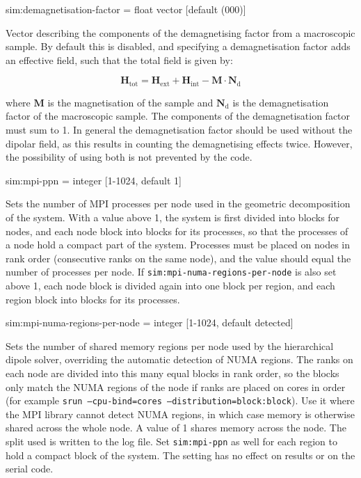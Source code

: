 {\zicf sim:demagnetisation-factor = float vector [default (000)]} Vector describing the components of the demagnetising factor from a macroscopic sample. By default this is disabled, and specifying a demagnetisation factor adds an effective field, such that the total field is given by:

\begin{equation*}
\mathbf{H}_{\mathrm{tot}} = \mathbf{H}_{\mathrm{ext}} + \mathbf{H}_{\mathrm{int}} - \mathbf{M} \cdot \mathbf{N}_{\mathrm{d}}
\end{equation*}

\noindent where $\mathbf{M}$ is the magnetisation of the sample and $\mathbf{N}_{\mathrm{d}}
$ is the demagnetisation factor of the macroscopic sample. The components of the demagnetisation factor must sum to 1. In general the demagnetisation factor should be used without the dipolar field, as this results in counting the demagnetising effects twice. However, the possibility of using both is not prevented by the code.


{\zicf sim:mpi-ppn = integer [1-1024, default 1]} Sets the number of MPI processes per node used in the geometric decomposition of the system. With a value above 1, the system is first divided into blocks for nodes, and each node block into blocks for its processes, so that the processes of a node hold a compact part of the system. Processes must be placed on nodes in rank order (consecutive ranks on the same node), and the value should equal the number of processes per node. If \texttt{sim:mpi-numa-regions-per-node} is also set above 1, each node block is divided again into one block per region, and each region block into blocks for its processes.

{\zicf sim:mpi-numa-regions-per-node = integer [1-1024, default detected]} Sets the number of shared memory regions per node used by the hierarchical dipole solver, overriding the automatic detection of NUMA regions. The ranks on each node are divided into this many equal blocks in rank order, so the blocks only match the NUMA regions of the node if ranks are placed on cores in order (for example \texttt{srun --cpu-bind=cores --distribution=block:block}). Use it where the MPI library cannot detect NUMA regions, in which case memory is otherwise shared across the whole node. A value of 1 shares memory across the node. The split used is written to the log file. Set \texttt{sim:mpi-ppn} as well for each region to hold a compact block of the system. The setting has no effect on results or on the serial code.

